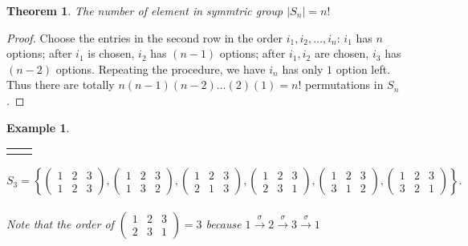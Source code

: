 \documentclass{article}
\theoremstyle{MyNonumberplain}
\theoremstyle{break}
\newtheorem*{proof}{Proof. }
\newcommand{\nline}{\begin{tabular}{ll}&\\\end{tabular}}
\theoremstyle{break}
\newtheorem{theorem}{Theorem}[section]
\newtheorem{example}{Example}[section]
\theoremstyle{break}
\theoremstyle{definition}
\theoremstyle{break}
\begin{document}
\begin{thmbox}
    \begin{theorem}
        The number of element in symmtric group $| S_n | = n!$
    \end{theorem}
    \begin{prfbox}
        \begin{proof}
            Choose the entries in the second row in the order $i_1, i_2, \ldots, i_n$:
            $i_1$ has $n$ options; after $i_1$ is chosen, $i_2$ has $(n - 1)$ options;
            after $i_1, i_2$ are chosen, $i_3$ has $(n - 2)$ options. Repeating the
            procedure, we have $i_n$ has only $1$ option left. Thus there are totally $n
            (n - 1) (n - 2) \ldots (2) (1) = n!$ permutations in $S_n$.
        \end{proof}
    \end{prfbox}
\end{thmbox}
\begin{expbox}
    \begin{example}

        \nline


        $S_3 = \left\{ \left(\begin{array}{ccc}
            1 & 2 & 3\\
            1 & 2 & 3
          \end{array}\right), \left(\begin{array}{ccc}
            1 & 2 & 3\\
            1 & 3 & 2
          \end{array}\right), \left(\begin{array}{ccc}
            1 & 2 & 3\\
            2 & 1 & 3
          \end{array}\right), \left(\begin{array}{ccc}
            1 & 2 & 3\\
            2 & 3 & 1
          \end{array}\right), \left(\begin{array}{ccc}
            1 & 2 & 3\\
            3 & 1 & 2
          \end{array}\right), \left(\begin{array}{ccc}
            1 & 2 & 3\\
            3 & 2 & 1
          \end{array}\right) \right\} .$\\\\

          Note that the order of $\left(\begin{array}{ccc}
            1 & 2 & 3\\
            2 & 3 & 1
          \end{array}\right) = 3$ because $1 \xrightarrow{\sigma} 2 \xrightarrow{\sigma}
          3 \xrightarrow{\sigma} 1$
    \end{example}
\end{expbox}
\end{document}

